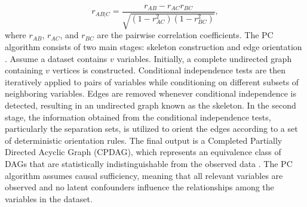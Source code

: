\documentclass[review,12pt]{elsarticle}
\begin{document}
\begin{equation}
r_{AB|C}
=
\frac{r_{AB}-r_{AC}r_{BC}}
{\sqrt{(1-r_{AC}^{2})(1-r_{BC}^{2})}},
\label{eq:partialcorr}
\end{equation}
where $r_{AB}$, $r_{AC}$, and $r_{BC}$ are the pairwise correlation coefficients.
The PC algorithm consists of two main stages: skeleton construction and edge orientation \cite{kalisch2007estimating}. Assume a dataset contains $v$ variables. Initially, a complete undirected graph containing $v$ vertices is constructed. Conditional independence tests are then iteratively applied to pairs of variables while conditioning on different subsets of neighboring variables. Edges are removed whenever conditional independence is detected, resulting in an undirected graph known as the skeleton.
In the second stage, the information obtained from the conditional independence tests, particularly the separation sets, is utilized to orient the edges according to a set of deterministic orientation rules. The final output is a Completed Partially Directed Acyclic Graph (CPDAG), which represents an equivalence class of DAGs that are statistically indistinguishable from the observed data \cite{spirtes2000causation,kalisch2007estimating}.
The PC algorithm assumes causal sufficiency, meaning that all relevant variables are observed and no latent confounders influence the relationships among the variables in the dataset.
\end{document}
